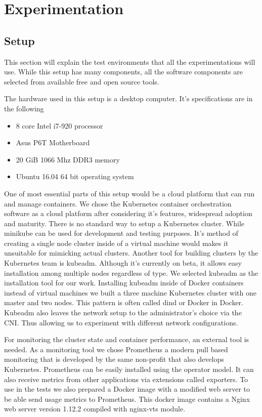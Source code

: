 \documentclass[12pt,oneandhalf,chaparabic,ceng,ms,eng,oneside,pntc]{gsufbe}
\begin{document}

\chapter{Experimentation}
\section{Setup}
This section will explain the test environments that all the experimentations will use. While this
setup has many components, all the software components are selected from available free and open source
tools.

The hardware used in this setup is a desktop computer. It's specifications are in the following
\begin{itemize}
 \item 8 core Intel i7-920 processor
 \item Asus P6T Motherboard
 \item 20 GiB 1066 Mhz DDR3 memory
 \item Ubuntu 16.04 64 bit operating system
\end{itemize}

One of most essential parts of this setup would be a cloud platform that can run and manage containers.
We chose the Kubernetes container orchestration software as a cloud platform after considering it's
features, widespread adoption and maturity. There is no standard way to setup a Kubernetes cluster.
While minikube can be used for development and testing purposes. It's method of creating a single node
cluster inside of a virtual machine would makes it unsuitable for mimicking actual clusters. Another
tool for building clusters by the Kubernetes team is kubeadm. Although it's currently on beta, it
allows easy installation among multiple nodes regardless of type. We selected kubeadm as the 
installation tool for our work. Installing kubeadm inside of Docker containers instead of virtual
machines we built a three machine Kubernetes cluster with one master and two nodes. This pattern is
often called dind or Docker in Docker. Kubeadm also leaves the network setup to the administrator's
choice via the CNI. Thus allowing us to experiment with different network configurations.

For monitoring the cluster state and container performance, an external tool is needed. As a monitoring
tool we chose Prometheus a modern pull based monitoring that is developed by the same non-profit that
also develops Kubernetes. Prometheus can be easily installed using the operator model. It can also
receive metrics from other applications via extensions called exporters. To use in the tests we also 
prepared a Docker image with a modified web server to be able send usage metrics to Prometheus. This
docker image contains a Nginx web server version 1.12.2 compiled with nginx-vts module.
\end{document}
